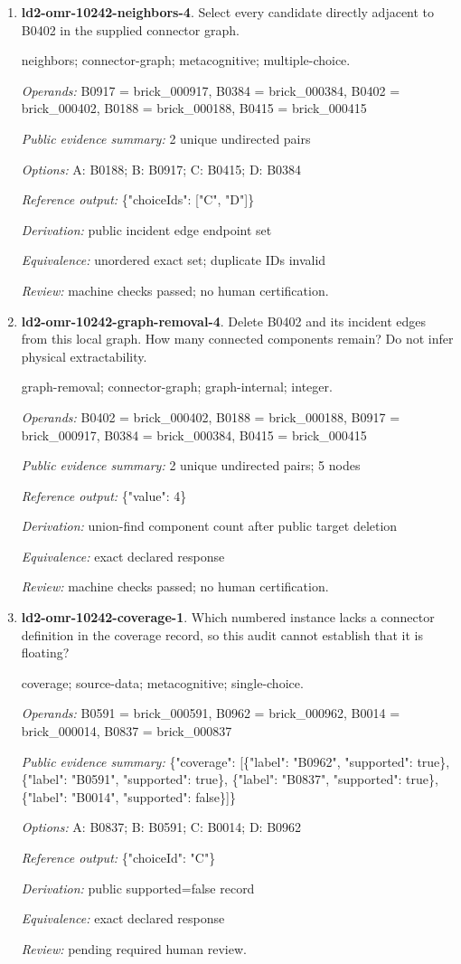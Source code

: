 \begin{enumerate}
\item \textbf{ld2-omr-10242-neighbors-4}. Select every candidate directly adjacent to B0402 in the supplied connector graph.
\par{\small neighbors; connector-graph; metacognitive; multiple-choice.\par\textit{Operands:} B0917 = brick\_000917, B0384 = brick\_000384, B0402 = brick\_000402, B0188 = brick\_000188, B0415 = brick\_000415\par\textit{Public evidence summary:} 2 unique undirected pairs\par\textit{Options:} A: B0188; B: B0917; C: B0415; D: B0384\par\textit{Reference output:} \{"choiceIds": ["C", "D"]\}\par\textit{Derivation:} public incident edge endpoint set\par\textit{Equivalence:} unordered exact set; duplicate IDs invalid\par\textit{Review:} machine checks passed; no human certification.}
\item \textbf{ld2-omr-10242-graph-removal-4}. Delete B0402 and its incident edges from this local graph. How many connected components remain? Do not infer physical extractability.
\par{\small graph-removal; connector-graph; graph-internal; integer.\par\textit{Operands:} B0402 = brick\_000402, B0188 = brick\_000188, B0917 = brick\_000917, B0384 = brick\_000384, B0415 = brick\_000415\par\textit{Public evidence summary:} 2 unique undirected pairs; 5 nodes\par\textit{Reference output:} \{"value": 4\}\par\textit{Derivation:} union-find component count after public target deletion\par\textit{Equivalence:} exact declared response\par\textit{Review:} machine checks passed; no human certification.}
\item \textbf{ld2-omr-10242-coverage-1}. Which numbered instance lacks a connector definition in the coverage record, so this audit cannot establish that it is floating?
\par{\small coverage; source-data; metacognitive; single-choice.\par\textit{Operands:} B0591 = brick\_000591, B0962 = brick\_000962, B0014 = brick\_000014, B0837 = brick\_000837\par\textit{Public evidence summary:} \{"coverage": [\{"label": "B0962", "supported": true\}, \{"label": "B0591", "supported": true\}, \{"label": "B0837", "supported": true\}, \{"label": "B0014", "supported": false\}]\}\par\textit{Options:} A: B0837; B: B0591; C: B0014; D: B0962\par\textit{Reference output:} \{"choiceId": "C"\}\par\textit{Derivation:} public supported=false record\par\textit{Equivalence:} exact declared response\par\textit{Review:} pending required human review.}

\end{enumerate}
